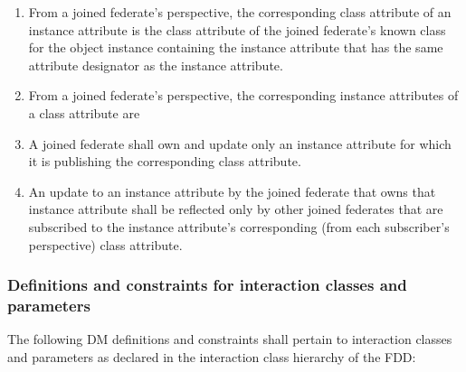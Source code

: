 \begin{compactstdpage}
\begin{enumerate}[label=\alph*),leftmargin=2.35em,itemsep=1pt,topsep=3pt,parsep=0pt,start=15]
then the object instance shall be known to that joined federate and that object instance has a known class at that joined federate. The known class of that object instance at that joined federate shall be the object instance's registered class if the joined federate knows about the object instance as a result of having registered it. The known class of that object instance at that joined federate shall be the object instance's discovered class if the joined federate knows about the object instance as a result of having discovered it.
\item From a joined federate's perspective, the corresponding class attribute of an instance attribute is the class attribute of the joined federate's known class for the object instance containing the instance attribute that has the same attribute designator as the instance attribute.
\item From a joined federate's perspective, the corresponding instance attributes of a class attribute are
\item A joined federate shall own and update only an instance attribute for which it is publishing the corresponding class attribute.
\item An update to an instance attribute by the joined federate that owns that instance attribute shall be reflected only by other joined federates that are subscribed to the instance attribute's corresponding (from each subscriber's perspective) class attribute.
    \end{enumerate}

    \subsubsection{Definitions and constraints for interaction classes and parameters}

    The following DM definitions and constraints shall pertain to interaction classes and parameters as declared in the interaction class hierarchy of the FDD:


\end{compactstdpage}
